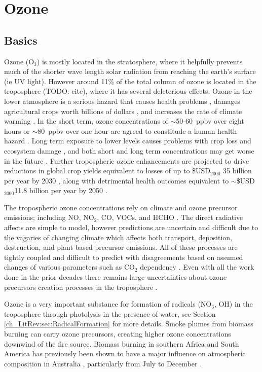 \section{Ozone}
\label{ch_LitRev:sec:Ozone}
  
  \subsection{Basics}
    Ozone (O$_3$) is mostly located in the stratosphere, where it helpfully prevents much of the shorter wave length solar radiation from reaching the earth's surface (ie UV light).
    However around 11\% of the total column of ozone is located in the troposphere (TODO: cite), where it has several deleterious effects.
    Ozone in the lower atmosphere is a serious hazard that causes health problems \citep{Hsieh2013}, damages agricultural crops worth billions of dollars \citep{Avnery2011}, and increases the rate of climate warming \citep{IPCC_2013_chap8}.
    In the short term, ozone concentrations of $\sim$50-60~ppbv over eight hours or $\sim$80~ppbv over one hour are agreed to constitude a human health hazard \citep{Ayers2006,Lelieveld2009}. 
    Long term exposure to lower levels causes problems with crop loss and ecosystem damage \citep{Emberson2003}, and both short and long term concentrations may get worse in the future \citep{Lelieveld2009, Stevenson2013}.
    Further tropospheric ozone enhancements are projected to drive reductions in global crop yields equivalent to losses of up to \$USD$_{2000}$ 35 billion per year by 2030 \citep{Avnery2011}, along with detrimental health outcomes equivalent to $\sim$\$USD$_{2000}$11.8 billion per year by 2050 \citep{Selin2009}.
    
    The tropospheric ozone concentrations rely on climate and ozone precursor emissions; including NO, NO$_2$, CO, VOCs, and HCHO \citep{Atkinson2000, Young2013, Marvin2017}. 
    The direct radiative affects are simple to model, however predictions are uncertain and difficult due to the vagaries of changing climate which affects both transport, deposition, destruction, and plant based precursor emissions.
    All of these processes are tightly coupled and difficult to predict with disagreements based on assumed changes of various parameters such as CO$_2$ dependency \citep{Young2013}.
    Even with all the work done in the prior decades there remains large uncertainties about ozone precursors creation processes in the troposphere \citep{Mazzuca2016}.
    
    Ozone is a very important substance for formation of radicals (NO$_3$, OH) in the troposphere through photolysis in the presence of water, see Section \ref{ch_LitRev:sec:RadicalFormation} for more details.
    Smoke plumes from biomass burning can carry ozone precursors, creating higher ozone concentrations downwind of the fire source.
    Biomass burning in southern Africa and South America has previously been shown to have a major influence on atmospheric composition in Australia \citep{Oltmans2001, Gloudemans2006, Edwards2006}, particularly from July to December \citep{Pak2003, Liu2016}.
    
